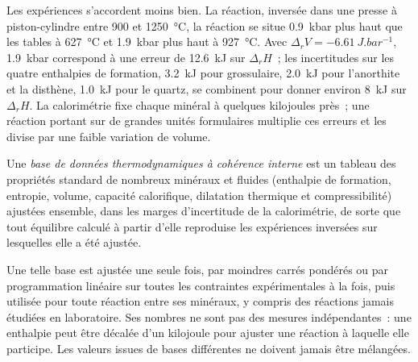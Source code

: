 Les expériences s'accordent moins bien. La réaction, inversée dans une presse à piston-cylindre entre
900 et \qty{1250}{\celsius}, la réaction se situe \qty{0.9}{kbar} plus haut que les
tables à \qty{627}{\celsius} et \qty{1.9}{kbar} plus haut à
\qty{927}{\celsius}. Avec $\Delta_rV = \qty{-6.61}{J.bar^{-1}}$,
\qty{1.9}{kbar} correspond à une erreur de \qty{12.6}{kJ} sur $\Delta_rH$~; les
incertitudes sur les quatre enthalpies de formation, \qty{3.2}{kJ} pour
grossulaire, \qty{2.0}{kJ} pour l'anorthite et la disthène, \qty{1.0}{kJ} pour
le quartz, se combinent pour donner environ \qty{8}{kJ} sur $\Delta_rH$. La calorimétrie fixe chaque
minéral à quelques kilojoules près~; une réaction portant sur de grandes unités formulaires multiplie
ces erreurs et les divise par une faible variation de volume.

\begin{definition}\label{def:b3:petrological-thermodynamics:dataset}
Une \emph{base de données thermodynamiques à cohérence interne}
est un tableau des propriétés standard de
nombreux minéraux et fluides (enthalpie de formation, entropie, volume, capacité
calorifique, dilatation thermique et compressibilité) ajustées ensemble, dans les
marges d'incertitude de la calorimétrie, de sorte que tout équilibre calculé à partir d'elle
reproduise les expériences inversées sur lesquelles elle a été ajustée.
\end{definition}

Une telle base est ajustée une seule fois, par moindres carrés pondérés ou par
programmation linéaire sur toutes les contraintes expérimentales à la fois, puis utilisée pour toute
réaction entre ses minéraux, y compris des réactions jamais étudiées en
laboratoire. Ses nombres ne sont pas des mesures indépendantes~: une enthalpie peut
être décalée d'un kilojoule pour ajuster une réaction à laquelle elle participe. Les valeurs issues
de bases différentes ne doivent jamais être mélangées.

